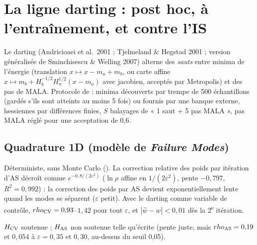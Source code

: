 \section{La ligne darting : post hoc, à l'entraînement, et contre l'IS}
\label{sec:darting}

Le darting (Andricioaei et al.\ 2001 ; Tjelmeland \& Hegstad 2001 ; version généralisée de Sminchisescu \& Welling 2007) alterne des \emph{sauts} entre minima de l'énergie (translation $x\mapsto x-m_a+m_b$, ou carte affine $x\mapsto m_b+H_b^{-1/2}H_a^{1/2}(x-m_a)$ avec jacobien, acceptés par Metropolis) et des pas de MALA. Protocole de  : minima découverts par trempe de 500 échantillons (gardés s'ils sont atteints au moins 5 fois) ou fournis par une banque externe, hessiennes par différences finies, $S$ balayages de « 1 saut + 5 pas MALA », pas MALA réglé pour une acceptation de 0,6.

\subsection{Quadrature 1D (modèle de \emph{Failure Modes})}
Déterministe, sans Monte Carlo (). La correction relative des poids par itération d'AS décroît comme $e^{-0{,}8/(2\varepsilon^2)}$ ($\ln\rho$ affine en $1/(2\varepsilon^2)$, pente $-0{,}797$, $R^2=0{,}992$) : la correction des poids par AS devient exponentiellement lente quand les modes se séparent ($\varepsilon$ petit). Avec le darting comme variable de contrôle, $\rho_{\rm CV}=0{,}93$--$1{,}42$ pour tout $\varepsilon$, et $|\hat w-w|<0{,}01$ dès la 2\textsuperscript{e} itération.
\begin{verdict}$H_{\rm CV}$ soutenue ; $H_{\rm AS}$ non soutenue telle qu'écrite (pente juste, mais $\rho_{\rm AS}=0{,}19$ et $0{,}054$ à $\varepsilon=0{,}35$ et $0{,}30$, au-dessus du seuil 0,05).\end{verdict}

